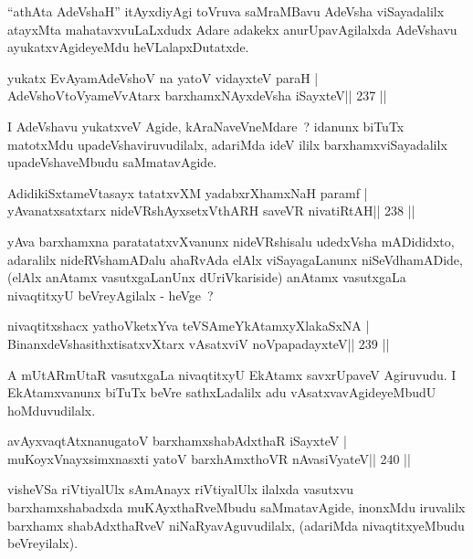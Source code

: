 \begin{artha}
``athAta AdeVshaH'' itAyxdiyAgi toVruva saMraMBavu AdeVsha
  viSayadalilx atayxMta mahatavxvuLaLxdudx Adare adakekx
  anurUpavAgilalxda AdeVshavu ayukatxvAgideyeMdu heVLalapxDutatxde.
\end{artha}


\begin{shl}
yukatx EvAyamAdeVshoV na yatoV vidayxteV paraH |
AdeVshoV\s toV\s yameVvAtarx barxhamxNAyxdeVsha iSayxteV\hfill || 237 ||
\end{shl}

\begin{artha}
I AdeVshavu yukatxveV Agide, kAraNaveVneMdare~? idanunx biTuTx matotxMdu upadeVshaviruvudilalx, adariMda ideV ililx barxhamxviSayadalilx upadeVshaveMbudu saMmatavAgide.
\end{artha}

\begin{shl}
AdidikiSxtameVtasayx tatatxvXM yadabxrXhamxNaH paramf |
yAvanatxsatxtarx nideVRshAyxsetxV\s thARH saveVR nivatiRtAH\hfill || 238 ||
\end{shl}

\begin{artha}
yAva barxhamxna paratatatxvXvanunx nideVRshisalu udedxVsha mADididxto,
adaralilx nideRVshamADalu ahaRvAda elAlx viSayagaLanunx
niSeVdhamADide, (elAlx anAtamx vasutxgaLanUnx dUriVkariside)
anAtamx vasutxgaLa nivaqtitxyU beVreyAgilalx - heVge~?
\end{artha}

\begin{shl}
nivaqtitxshacx yathoVketxYva teVSAmeYkAtamxyXlakaSxNA |
BinanxdeVshasithxtisatxvXtarx vAsatxviV noVpapadayxteV\hfill || 239 ||
\end{shl}

\begin{artha}
A mUtARmUtaR vasutxgaLa nivaqtitxyU EkAtamx savxrUpaveV Agiruvudu. I EkAtamxvanunx biTuTx beVre sathxLadalilx adu vAsatxvavAgideyeMbudU hoMduvudilalx.
\end{artha}


\begin{shl}
avAyxvaqtAtxnanugatoV barxhamxshabAdxthaR iSayxteV |
muKoyxV\s nayxsimxnasxti yatoV barxhAmxthoVR nAvasiVyateV\hfill || 240 ||
\end{shl}

\begin{artha}
visheVSa riVtiyalUlx sAmAnayx riVtiyalUlx ilalxda vasutxvu barxhamxshabadxda muKAyxthaRveMbudu saMmatavAgide, inonxMdu iruvalilx barxhamx shabAdxthaRveV niNaRyavAguvudilalx, (adariMda nivaqtitxyeMbudu beVreyilalx).
\end{artha}


